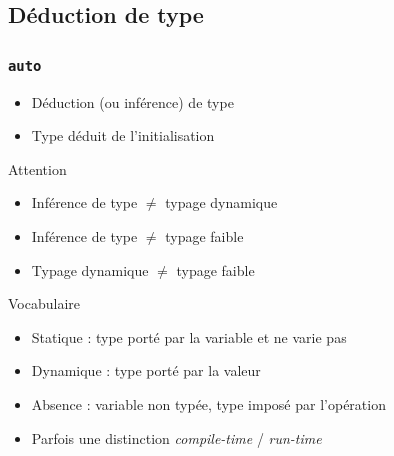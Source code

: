\documentclass[C++.tex]{subfiles}
\begin{document}
\subsection*{Déduction de type}
\begin{frame}[fragile]
	\frametitle{\lstinline|auto|}
	\begin{itemize}
		\item Déduction (ou inférence) de type


		\item Type déduit de l'initialisation
	\end{itemize}

	\pause

	\begin{alertblock}{Attention}
		\begin{itemize}
			\item Inférence de type $\neq$ typage dynamique
			\item Inférence de type $\neq$ typage faible
			\item Typage dynamique $\neq$ typage faible
		\end{itemize}
	\end{alertblock}

	\pause

	\begin{block}{Vocabulaire}
		\begin{itemize}
			\item Statique : type porté par la variable et ne varie pas
			\item Dynamique : type porté par la valeur
			\item Absence : variable non typée, type imposé par l'opération
			\item Parfois une distinction \textit{compile-time} / \textit{run-time}
		\end{itemize}
		
	\end{block}
\end{frame}
\end{document}
